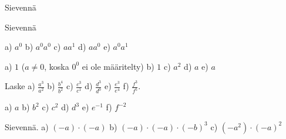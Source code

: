 \begin{tehtavasivu}
\begin{tehtava}
  		Sievennä
        \begin{vastaus}
        \end{vastaus}
\end{tehtava}



\begin{tehtava}
  		Sievennä
        \begin{vastaus}
        \end{vastaus}
\end{tehtava}


    \begin{tehtava}
        a) $a^0$
        b) $a^0a^0$
        c) $aa^1$
        d) $aa^0$
        e) $a^0a^1$
        
        \begin{vastaus}
            a) $1$  ($a\neq0$, koska $0^0$ ei ole määritelty)
            b) $1$
            c) $a^2$
            d) $a$
            e) $a$
        \end{vastaus}
    \end{tehtava}

    \begin{tehtava}
        Laske
        a) $\frac{a^3}{a^2}$
        b) $\frac{b^4}{b^2}$
        c) $\frac{c^3}{c^1}$
        d) $\frac{d^3}{d^0}$
        e) $\frac{e^3}{e^4}$
        f) $\frac{f^3}{f^5}$.
        
        \begin{vastaus}
            a) $a$
            b) $b^2$
            c) $c^2$
            d) $d^3$
            e) $e^{-1}$
            f) $f^{-2}$
        \end{vastaus}
    \end{tehtava}
    
        \begin{tehtava}
     Sievennä.
        a) $(-a)\cdot(-a)$ 
        b) $(-a)\cdot(-a)\cdot(-b)^3$ 
        c) $(-a^2)\cdot(-a)^2$


\end{tehtava}
\end{tehtavasivu}
